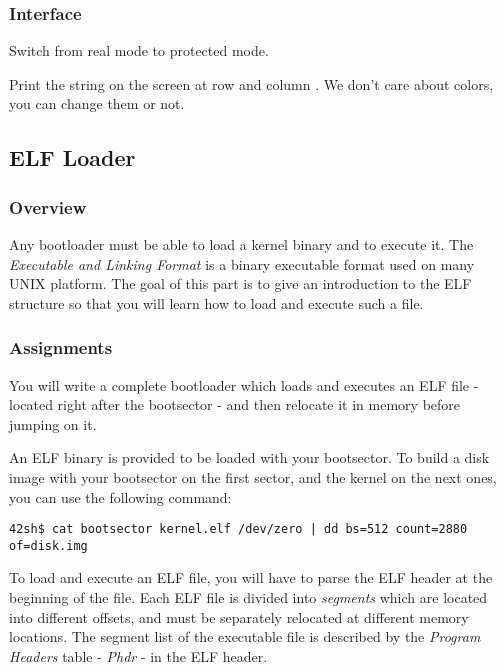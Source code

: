 \subsubsection*{Interface}
{
  Switch from real mode to protected mode.
}

{
  Print the string  on the screen at row 
  and column . We don't care about colors, you can change them
  or not.
}

%
%

\newpage

\subsection{ELF Loader}

\subsubsection*{Overview}
Any bootloader must be able to load a kernel binary and to execute it.
The \emph{Executable and Linking Format} is a binary executable format used on
many UNIX platform. The goal of this part is to give an introduction to the
ELF structure so that you will learn how to load and execute such a file.

\subsubsection*{Assignments}
You will write a complete bootloader which loads and executes an ELF file
- located right after the bootsector - and then relocate it in memory
before jumping on it.

An ELF binary is provided to be loaded with your bootsector. To build
a disk image with your bootsector on the first sector, and the kernel on the
next ones, you can use the following command:

\begin{verbatim}
42sh$ cat bootsector kernel.elf /dev/zero | dd bs=512 count=2880 of=disk.img
\end{verbatim}

To load and execute an ELF file, you will have to parse the ELF header at the
beginning of the file. Each ELF file is divided into \emph{segments} which are
located into different offsets, and must be separately relocated at different
memory locations. The segment list of the executable file is described by the
\emph{Program Headers} table - \emph{Phdr} - in the ELF header.

